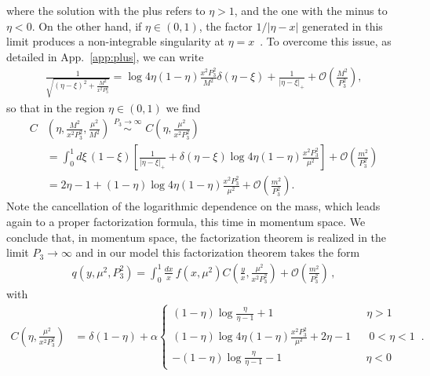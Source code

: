 where the solution with the plus refers to $\eta>1$, and the one with the minus
to $\eta<0$. On the other hand, if $\eta \in \left(0,1\right)$, the factor
$1/|\eta-x|$ generated in this limit produces a non-integrable singularity at
$\eta = x$~\cite{Radyushkin:2017lvu}. To overcome this issue, as detailed in App.~\ref{app:plus}, we can
write
\begin{align}
	\label{eq::limit} 
	\frac{1}{\sqrt{\left(\eta-\xi\right)^2 + \frac{M^2}{x^2 P_3^2}}} 
	= \log 4\eta\left(1-\eta\right) \frac{x^2P_3^2}{M^2}
	\delta\left(\eta-\xi\right) + \frac{1}{|\eta-\xi|_+} + \mathcal{O}\left(\frac{M^2}{P_3^2}\right),
\end{align}
so that in the region $\eta \in \left(0,1\right)$  we find
\begin{align}
	C&\left(\eta,\frac{M^2}{x^2 P_3^2}, \frac{\mu^2}{M^2}\right) 
	 \,\,
	\stackrel{P_3\rightarrow \infty}{\sim}\,\, C\left(\eta,\frac{\mu^2}{x^2 P_3^2}\right) \nonumber\\
	&=\int_0^1 d\xi\, \left(1-\xi\right) 
	\left[\frac{1}{|\eta-\xi|_+} + \delta\left(\eta-\xi\right)
	\log 4\eta\left(1-\eta\right)
	\frac{x^2P_3^2}{\mu^2} \right]  + \mathcal{O}\left(\frac{m^2}{P_3^2}\right) \nonumber \\
	&=2\eta -1 + \left(1-\eta\right)
	\log 4\eta\left(1-\eta\right) \frac{x^2P_3^2}{\mu^2} + \mathcal{O}\left(\frac{m^2}{P_3^2}\right). 
\end{align}
Note the cancellation of the logarithmic dependence on the mass, which leads
again to a proper factorization formula, this time in momentum space. We
conclude that, in momentum space, the factorization theorem is realized in the
limit $P_3\rightarrow \infty$ and in our model this factorization theorem takes
the form
\begin{align}
	\label{eq::factmomentum}
	q\left(y, \mu^2, P_3^2\right) = 
	\int_{0}^{1} \frac{dx}{x}\, 
	f\left(x,\mu^2\right) 
	C\left(\frac{y}{x},\frac{\mu^2}{x^2 P_3^2}\right) + \mathcal{O}\left(\frac{m^2}{P_3^2}\right)\, ,
\end{align}
with
\begin{equation}
	\label{eq::matching_scalar}
	\begin{split}
	C\left(\eta,\frac{\mu^2}{x^2 P_3^2} \right)&= \delta\left(1-\eta\right) + \alpha 
	\begin{cases} 
	\left(1-\eta\right)\log\frac{\eta}{\eta-1} + 1 
	\,\,\,\,\,\,\,\,\,\,\,\,\,\,\,\,\,\,\,\,\,\,\,\,\,\,\,\,\,\,\,\,\,\,\,\,\,\,\,\,\,\,\,\,\,\,\,\,\,\,\, \eta > 1\\ 
	\left(1-\eta\right)\log 4\eta\left(1-\eta\right)\frac{x^2P_3^2}{\mu^2} + 2\eta -1 \,\,\,\,\,\,\,\,\,\, 0<\eta < 1 \\ 
	-\left(1-\eta\right)\log\frac{\eta}{\eta-1} - 1 \,\,\,\,\,\,\,\,\,\,\,\,\,\,\,\,\,\,\,\,\,\,\,\,\,\,\,\,\,\,\,\,\,\,\,\,\,\,\,\,\,\,\,\,\,\, \eta<0
	\end{cases}
	\,.
	\end{split}
\end{equation}

